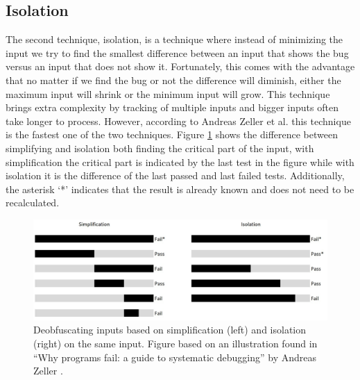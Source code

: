 \subsection{Isolation}
\label{inputReduction:Isolation}
The second technique, isolation, is a technique where instead of minimizing the input we try to find the smallest difference between an input that shows the bug versus an input that does not show it. Fortunately, this comes with the advantage that no matter if we find the bug or not the difference will diminish, either the maximum input will shrink or the minimum input will grow. 
This technique brings extra complexity by tracking of multiple inputs and bigger inputs often take longer to process. However, according to Andreas Zeller et al. \cite{5zeller2002simplifyingIsolatingFailure-inducing} this technique is the fastest one of the two techniques. 
Figure \ref{fig:simplificationIsolation} shows the difference between simplifying and isolation both finding the critical part of the input, with simplification the critical part is indicated by the last test in the figure while with isolation it is the difference of the last passed and last failed tests. Additionally, the  asterisk ‘*’ indicates that the result is already known and does not need to be recalculated.
\begin{figure}
	\centering
	\includegraphics[width=1.0\textwidth]{images/simplificationIsolation}
	\caption{Deobfuscating inputs based on simplification (left) and isolation (right) on the same input. Figure based on an illustration found in “Why programs fail: a guide to systematic debugging” by Andreas Zeller \cite{bookZellerwhyProgramsFail}.}
	\label{fig:simplificationIsolation}
\end{figure}

